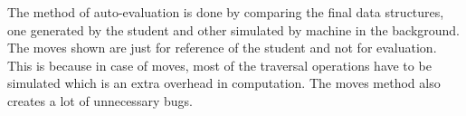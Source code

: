 \documentclass[aps,letterpaper,12pt]{revtex4}
\begin{document}
The method of auto-evaluation is done by comparing the final data structures, one generated by the student and other simulated by machine in the background. The moves shown are just for reference of the student and not for evaluation. This is because in case of moves, most of the traversal operations have to be simulated which is an extra overhead in computation. The moves method also creates a lot of unnecessary bugs.\\


%
%
\end{document}
